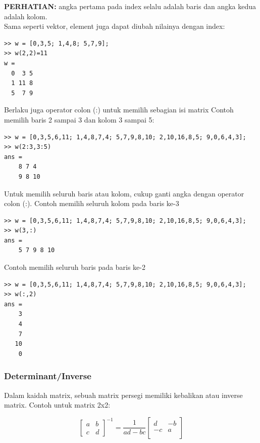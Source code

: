 \documentclass[12pt]{book}
\begin{document}
	\textbf{PERHATIAN:} angka pertama pada index selalu adalah baris dan angka kedua adalah kolom.\\

	Sama seperti vektor, element juga dapat diubah nilainya dengan index:
	\begin{verbatim}
>> w = [0,3,5; 1,4,8; 5,7,9];
>> w(2,2)=11
w = 
  0  3 5
  1 11 8
  5  7 9
	\end{verbatim}

	Berlaku juga operator colon (:) untuk memilih sebagian isi matrix
	Contoh memilih baris 2 sampai 3 dan kolom 3 sampai 5:
	\begin{verbatim}
>> w = [0,3,5,6,11; 1,4,8,7,4; 5,7,9,8,10; 2,10,16,8,5; 9,0,6,4,3];
>> w(2:3,3:5)
ans =
    8 7 4
    9 8 10
	\end{verbatim}

	Untuk memilih seluruh baris atau kolom, cukup ganti angka dengan operator colon (:).
	Contoh memilih seluruh kolom pada baris ke-3
	\begin{verbatim}
>> w = [0,3,5,6,11; 1,4,8,7,4; 5,7,9,8,10; 2,10,16,8,5; 9,0,6,4,3];
>> w(3,:)
ans =
    5 7 9 8 10
	\end{verbatim}

	Contoh memilih seluruh baris pada baris ke-2
	\begin{verbatim}
>> w = [0,3,5,6,11; 1,4,8,7,4; 5,7,9,8,10; 2,10,16,8,5; 9,0,6,4,3];
>> w(:,2)
ans =
    3
    4
    7
   10
    0
	\end{verbatim}
	
	\subsubsection{Determinant/Inverse}
	
	Dalam kaidah matrix, sebuah matrix persegi memiliki kebalikan atau inverse matrix.
	Contoh untuk matrix 2x2:
	
	\[
	\begin{bmatrix}
		a & b\\
		c & d
	\end{bmatrix}^{-1}
	=
	\frac{1}{ad-bc}
	\begin{bmatrix}
		d & -b \\
		-c & a\\
	\end{bmatrix}
	\]
	
\end{document}
